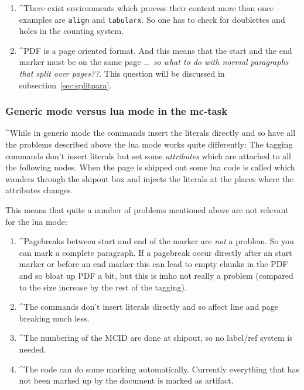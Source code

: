 \documentclass[DIV=12,parskip=half-,bibliography=totoc]{scrartcl}
\newcommand\PDF{PDF}
\begin{document}
\begin{enumerate}[beginpenalty=10000]
  \item
  \TagP^There exist environments which process their content more than once -- examples are \texttt{align} and \texttt{tabularx}.
       So one has to check for doublettes and holes in the counting system.\Pmeti


  \item
  \TagP^\PDF{} is a page oriented format. And this means that the start and the end marker must be on the same page \ldots\ \emph{so what to do with normal paragraphs that split over pages??}. This question will be discussed in subsection~\ref{sec:splitpara}.\Pmeti
\end{enumerate}

\subsubsection{Generic mode versus lua mode in the mc-task}

\TagP^While in generic mode the commands insert the literals directly and so have all the problems described above the lua mode works quite differently: The tagging commands don't insert literals but set some \emph{attributes} which are attached to all the following nodes. When the page is shipped out some lua code is called which wanders through the shipout box and injects the literals at the places where the attributes changes.

\TagP This means that quite a number of problems mentioned above are not relevant for the lua mode:\TagPend

\begin{enumerate}
\item \TagP^Pagebreaks between start and end of the marker are \emph{not} a problem. So you can mark a complete paragraph. If a pagebreak occur directly after an start marker or before an end marker this can lead to empty chunks in the \PDF{} and so bloat up \PDF{} a bit, but this is imho not really a problem (compared to the size increase by the rest of the tagging).\Pmeti
\item \TagP^The commands don't insert literals directly and so affect line and page breaking much less.\Pmeti
\item \TagP^The numbering of the MCID are done at shipout, so no label/ref system is needed.\Pmeti
\item \TagP^The code can do some marking automatically. Currently everything that has not been marked up by the document is marked as artifact.\Pmeti
\end{enumerate}
\end{document}

